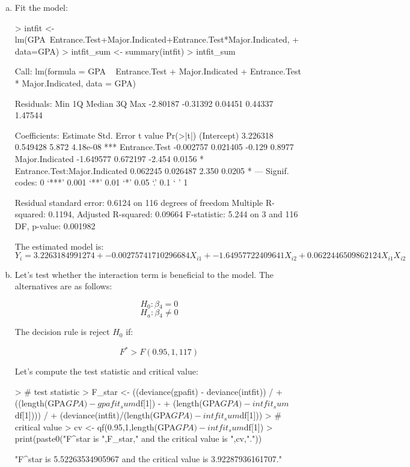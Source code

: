 \documentclass{article}
\begin{document}
\begin{enumerate}[a)]
\item{} Fit the model:

\begin{Schunk}
\begin{Sinput}
> intfit <- lm(GPA~Entrance.Test+Major.Indicated+Entrance.Test*Major.Indicated,
+              data=GPA)
> intfit_sum <- summary(intfit)
> intfit_sum
\end{Sinput}
\begin{Soutput}
Call:
lm(formula = GPA ~ Entrance.Test + Major.Indicated + Entrance.Test * 
    Major.Indicated, data = GPA)

Residuals:
     Min       1Q   Median       3Q      Max 
-2.80187 -0.31392  0.04451  0.44337  1.47544 

Coefficients:
                               Estimate Std. Error t value Pr(>|t|)    
(Intercept)                    3.226318   0.549428   5.872 4.18e-08 ***
Entrance.Test                 -0.002757   0.021405  -0.129   0.8977    
Major.Indicated               -1.649577   0.672197  -2.454   0.0156 *  
Entrance.Test:Major.Indicated  0.062245   0.026487   2.350   0.0205 *  
---
Signif. codes:  0 ‘***’ 0.001 ‘**’ 0.01 ‘*’ 0.05 ‘.’ 0.1 ‘ ’ 1

Residual standard error: 0.6124 on 116 degrees of freedom
Multiple R-squared:  0.1194,	Adjusted R-squared:  0.09664 
F-statistic: 5.244 on 3 and 116 DF,  p-value: 0.001982
\end{Soutput}
\end{Schunk}

The estimated model is:
$$ Y_i = 3.2263184991274 + -0.00275741710296684X_{i1} + -1.64957722409641X_{i2} + 0.0622446509862124X_{i1}X_{i2} $$

\item{} Let's test whether the interaction term is beneficial to the model. The alternatives are as follows:

$$ H_0: \beta{}_4 = 0 $$
$$ H_a: \beta{}_4 \neq{} 0 $$

The decision rule is reject $H_0$ if:

$$ F^* > F(0.95,1,117) $$

Let's compute the test statistic and critical value:

\begin{Schunk}
\begin{Sinput}
> # test statistic
> F_star <- ((deviance(gpafit) - deviance(intfit)) /
+   ((length(GPA$GPA) - gpafit_sum$df[1]) - 
+      (length(GPA$GPA) - intfit_sum$df[1]))) /
+   (deviance(intfit)/(length(GPA$GPA) - intfit_sum$df[1]))
> # critical value
> cv <- qf(0.95,1,length(GPA$GPA)-intfit_sum$df[1])
> print(paste0("F^star is ",F_star," and the critical value is ",cv,"."))
\end{Sinput}
\begin{Soutput}
[1] "F^star is 5.52263534905967 and the critical value is 3.92287936161707."
\end{Soutput}
\end{Schunk}


\end{enumerate}
\end{document}
